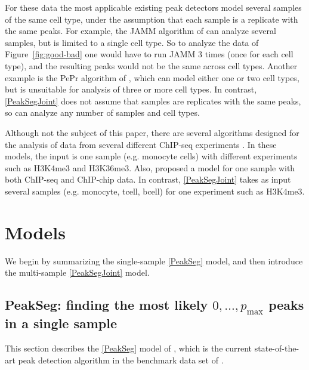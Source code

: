 \documentclass{article} %
\begin{document}
For these data the most applicable existing peak detectors model
several samples of the same cell type, under the assumption that each
sample is a replicate with the same peaks. For example, the JAMM
algorithm of \citet{JAMM} can analyze several samples, but is limited
to a single cell type. So to analyze the data of
Figure~\ref{fig:good-bad} one would have to run JAMM 3 times (once for
each cell type), and the resulting peaks would not be the same across
cell types. Another example is the PePr algorithm of \citet{PePr},
which can model either one or two cell types, but is unsuitable for
analysis of three or more cell types. In contrast, \ref{PeakSegJoint}
does not assume that samples are replicates with the same peaks, so
can analyze any number of samples and cell types.

Although not the subject of this paper, there are several algorithms
designed for the analysis of data from several different ChIP-seq
experiments \citep{chromhmm,segway,jmosaics}. In these models, the
input is one sample (e.g. monocyte cells) with different experiments
such as H3K4me3 and H3K36me3. Also,
\citet{hierarchical-joint} proposed a model for one sample with both
ChIP-seq and ChIP-chip data. In contrast, 
\ref{PeakSegJoint} takes as input several samples
(e.g. monocyte, tcell, bcell) for one experiment such as H3K4me3.

\section{Models}\label{sec:models}

We begin by summarizing the single-sample \ref{PeakSeg} model, and
then introduce the multi-sample \ref{PeakSegJoint} model.

\subsection{PeakSeg: finding the most likely $0,\dots,p_{\text{max}}$
  peaks in a single sample}

This section describes the \ref{PeakSeg} model of
\citet{HOCKING-PeakSeg}, which is the current state-of-the-art peak
detection algorithm in the benchmark data set of
\citet{hocking2014visual}. 
\end{document}
